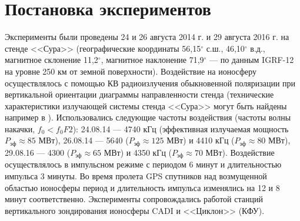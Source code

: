 \documentclass[12pt,a4paper]{article}
\begin{document}
\section{Постановка экспериментов} \label{sec:exp_setup}
Эксперименты были проведены 24 и 26 августа 2014 г. и 29 августа 2016 г. на стенде <<Сура>> (географические координаты 56,15$^{\circ}$ с.ш., 46,10$^{\circ}$ в.д., магнитное склонение 11,2$^{\circ}$, магнитное наклонение 71,9$^{\circ}$ --- по данным IGRF-12 \cite{Thebault2015} на уровне 250 км от земной поверхности). Воздействие на ионосферу осуществлялось с помощью КВ радиоизлучения обыкновенной поляризации при вертикальной ориентации диаграммы направленности стенда (технические характеристики излучающей системы стенда <<Сура>> могут быть найдены например в \cite{BERNHARDTSCALESGRACHEtAl1991}). Использовались следующие частоты воздействия (частоты волны накачки, $f_0<f_{0}F2$): 24.08.14 --- 4740 кГц (эффективная излучаемая мощность $P_{\text{эф}} \approx 85$ МВт), 26.08.14 --- 5640 ($P_{\text{эф}} \approx 125$ МВт) и 4410 кГц ($P_{\text{эф}} \approx 80$ МВт), 29.08.16 --- 4300 ($P_{\text{эф}} \approx 65$ МВт) и 4350 кГц ($P_{\text{эф}} \approx 70$ МВт). Воздействие осуществлялось в импульсном режиме с периодом 6 минут и длительностью импульса 3 минуты. Во время пролета GPS спутников над возмущенной областью ионосферы период и длительность импульса изменялись на 12 и 8 минут соответственно. Эксперименты сопровождались работой станций вертикального зондирования ионосферы CADI \cite{CADI_specs} и <<Циклон>> (КФУ).
\end{document}
